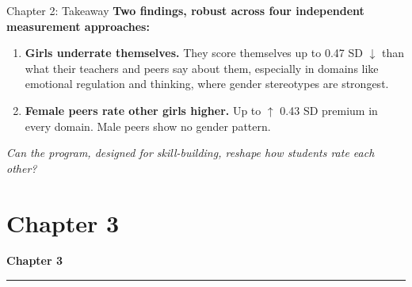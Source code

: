 \documentclass[xcolor=usenames,dvipsnames]{beamer}
\begin{document}
\begin{frame}{Chapter 2: Takeaway}\label{slide:ch2takeaway}
\small
\textbf{Two findings, robust across four independent measurement approaches:}
\vspace{0.3cm}
\begin{enumerate}
    \item \textbf{Girls underrate themselves.} They score themselves up to 0.47 SD $\downarrow$ than what their teachers and peers say about them, especially in domains like emotional regulation and thinking, where gender stereotypes are strongest.
    \vspace{0.3cm}
    \item \textbf{Female peers rate other girls higher.} Up to $\uparrow$ 0.43 SD premium in every domain. Male peers show no gender pattern. \\ \hyperlink{slide:selfeval_dev}{}
\hyperlink{slide:friendship}{}
\end{enumerate}

\vspace{0.2cm}


\textit{Can the program, designed for skill-building, reshape how students rate each other?}
\end{frame}
\section{Chapter 3}
\begin{frame}[plain]
\vspace{2.5cm}
{\LARGE \textbf{Chapter 3}}\\
{\color{HopBlue}\rule{0.4\linewidth}{2pt}}
\end{frame}
\end{document}
